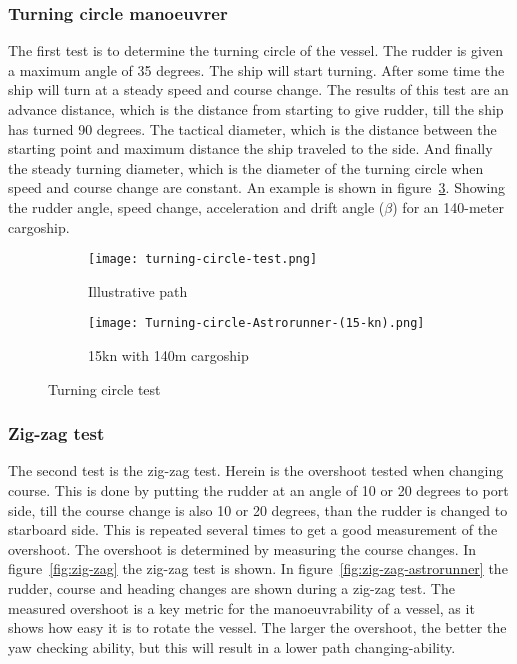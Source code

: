 \subsubsection{Turning circle manoeuvrer}
The first test is to determine the turning circle of the vessel. The rudder is given a maximum angle of 35 degrees. The ship will start turning. After some time the ship will turn at a steady speed and course change. The results of this test are an advance distance, which is the distance from starting to give rudder, till the ship has turned 90 degrees. The tactical diameter, which is the distance between the starting point and maximum distance the ship traveled to the side. And finally the steady turning diameter, which is the diameter of the turning circle when speed and course change are constant. An example is shown in figure~\ref{fig:turning-circle}. Showing the rudder angle, speed change, acceleration and drift angle ($\beta$) for an 140-meter cargoship.

\begin{figure}[p]
	\begin{subfigure}[b]{0.43\linewidth}
		\centering
		\texttt{[image: turning-circle-test.png]}
		\caption{Illustrative path}
		\label{fig:turning-circle-path}
	\end{subfigure} 
	\begin{subfigure}[b]{0.56\linewidth}
		\centering
		\texttt{[image: Turning-circle-Astrorunner-(15-kn).png]}
		\caption{15kn with 140m cargoship}
		\label{fig:turning-circle-astrorunner}
	\end{subfigure}
	\caption{Turning circle test}
	\label{fig:turning-circle} 
\end{figure}

\subsubsection{Zig-zag test}
The second test is the zig-zag test. Herein is the overshoot tested when changing course. This is done by putting the rudder at an angle of 10 or 20 degrees to port side, till the course change is also 10 or 20 degrees, than the rudder is changed to starboard side. This is repeated several times to get a good measurement of the overshoot. The overshoot is determined by measuring the course changes. In figure~\ref{fig:zig-zag} the zig-zag test is shown. In figure~\ref{fig:zig-zag-astrorunner} the rudder, course and heading changes are shown during a zig-zag test. The measured overshoot is a key metric for the manoeuvrability of a vessel, as it shows how easy it is to rotate the vessel. The larger the overshoot, the better the yaw checking ability, but this will result in a lower path changing-ability. 

